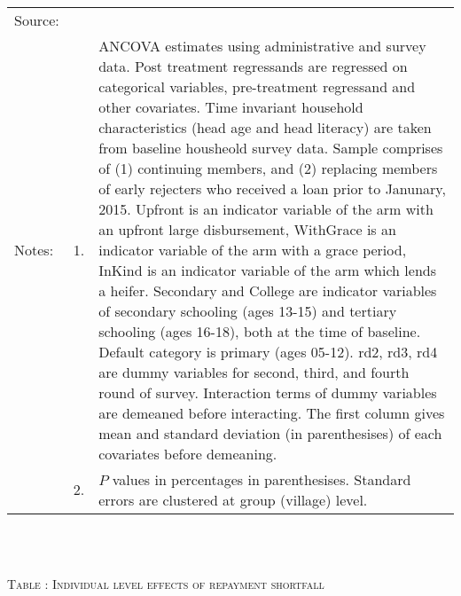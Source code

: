 \begin{minipage}[t]{14cm}
\begin{tikzpicture}
%
\end{tikzpicture}\\
\renewcommand{\arraystretch}{.8}
\setlength{\tabcolsep}{1pt} \begin{tabular}{>{\hfill\scriptsize}p{1cm}<{}>{\hfill\scriptsize}p{.25cm}<{}>{\scriptsize}p{12cm}<{\hfill}} 
Source:& \multicolumn{2}{l}{\scriptsize Estimated with GUK administrative and survey data.}\\
Notes: & 1. & ANCOVA estimates using administrative and survey data. Post treatment regressands are regressed on categorical variables, pre-treatment regressand and other covariates. Time invariant household characteristics (head age and head literacy) are taken from baseline housheold survey data. Sample comprises of (1) continuing members, and (2) replacing members of early rejecters who received a loan prior to Janunary, 2015.  \textsf{Upfront} is an indicator variable of the arm with an upfront large disbursement, \textsf{WithGrace} is an indicator variable of the arm with a grace period, \textsf{InKind} is an indicator variable of the arm which lends a heifer. \textsf{Secondary} and \textsf{College} are indicator variables of secondary schooling (ages 13-15) and tertiary schooling (ages 16-18), both at the time of baseline. Default category is primary (ages 05-12). \textsf{rd2, rd3, rd4} are dummy variables for second, third, and fourth round of survey. Interaction terms of dummy variables are demeaned before interacting. The first column gives mean and standard deviation (in parenthesises) of each covariates before demeaning. \\
& 2. & $P$ values in percentages in parenthesises. Standard errors are clustered at group (village) level. %
 \end{tabular}
\end{minipage} \\\\\hspace{-1cm}\begin{minipage}[t]{14cm} \hfil\textsc{\normalsize Table \thetable: Individual level effects of repayment shortfall\label{tab shortfall indiv}}\\ \setlength{\tabcolsep}{1pt}
  \setlength{\baselineskip}{8pt}
  \renewcommand{\arraystretch}{.55}
  \hfil\begin{tikzpicture}

\end{tikzpicture}
\end{minipage}
